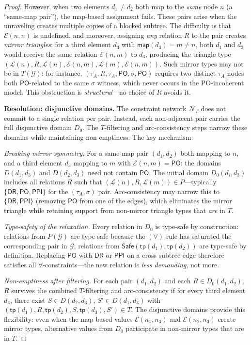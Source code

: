 \documentclass[a4paper,11pt]{article}
\theoremstyle{definition}
\newcommand{\DR}{\ensuremath{\mathsf{DR}}}
\newcommand{\PO}{\ensuremath{\mathsf{PO}}}
\newcommand{\PPI}{\ensuremath{\mathsf{PPI}}}
\newcommand{\tp}{\ensuremath{\mathsf{tp}}}
\newcommand{\Safe}{\ensuremath{\mathsf{Safe}}}
\newcommand{\GG}{\ensuremath{\mathcal{G}}}
\newcommand{\LL}{\ensuremath{\mathcal{L}}}
\newcommand{\EE}{\ensuremath{\mathcal{E}}}
\newcommand{\NN}{\ensuremath{\mathcal{N}}}
\begin{document}
\begin{proof}
However, when two elements $d_1 \neq d_2$ both map to the
\emph{same} node $n$ (a ``same-map pair''), the map-based
assignment fails.  These pairs arise when the unraveling
creates multiple copies of a blocked subtree.  The difficulty
is that $\EE(n, n)$ is undefined, and moreover, assigning
\emph{any} relation $R$ to the pair creates \emph{mirror
triangles}: for a third element $d_3$ with $\mathsf{map}(d_3)
= m \neq n$, both $d_1$ and $d_2$ would receive the same
relation $\EE(n, m)$ to $d_3$, producing the triangle type
$(\LL(n), R, \LL(n), \EE(n,m), \LL(m), \EE(n,m))$.
Such mirror types may not be in $T(\GG)$: for instance,
$(\tau_A, R, \tau_A, \PO, \sigma, \PO)$ requires two
distinct $\tau_A$ nodes both $\PO$-related to the same
$\sigma$ witness, which never occurs in the PO-incoherent
model.  This obstruction is \emph{structural}---no choice
of $R$ avoids it.

\medskip\noindent\textbf{Resolution: disjunctive domains.}\;
The constraint network $\NN_T$ does not commit to a single
relation per pair.  Instead, each non-adjacent pair carries
the full disjunctive domain $D_0$.  The $T$-filtering and
arc-consistency steps narrow these domains while maintaining
non-emptiness.  The key mechanism:

\smallskip\noindent\emph{Breaking mirror symmetry.}\;
For a same-map pair $(d_1, d_2)$ both mapping to $n$, and
a third element $d_3$ mapping to $m$ with $\EE(n, m) = \PO$:
the domains $D(d_1, d_3)$ and $D(d_2, d_3)$ need not contain
$\PO$.  The initial domain $D_0(d_i, d_3)$ includes all
relations $R$ such that $(\LL(n), R, \LL(m)) \in P$---typically
$\{\DR, \PO, \PPI\}$ for the $(\tau_A, \sigma)$ pair.
Arc-consistency may narrow this to $\{\DR, \PPI\}$ (removing
$\PO$ from one of the edges), which eliminates the mirror
triangle while retaining support from non-mirror triangle
types that \emph{are} in $T$.

\smallskip\noindent\emph{Type-safety of the relaxation.}\;
Every relation in $D_0$ is type-safe by construction:
relations from $P(\GG)$ are type-safe because the
$(\forall)$-rule has saturated the corresponding pair
in $\GG$; relations from $\Safe(\tp(d_1), \tp(d_2))$
are type-safe by definition.  Replacing
$\PO$ with $\DR$ or $\PPI$ on a cross-subtree edge therefore
satisfies all $\forall$-constraints---the new relation is
\emph{less demanding}, not more.

\smallskip\noindent\emph{Non-emptiness after filtering.}\;
For each pair $(d_1, d_2)$ and each $R \in D_0(d_1, d_2)$,
$R$ survives the combined $T$-filtering and arc-consistency
if for every third element $d_3$, there exist $S \in
D(d_2, d_3)$, $S' \in D(d_1, d_3)$ with $(\tp(d_1), R,
\tp(d_2), S, \tp(d_3), S') \in T$.  The disjunctive
domains provide this flexibility: even when the map-based
values $\EE(n_1, n_3)$ and $\EE(n_2, n_3)$ create mirror
types, alternative values from $D_0$ participate in
non-mirror types that are in $T$.


\end{proof}
\end{document}

